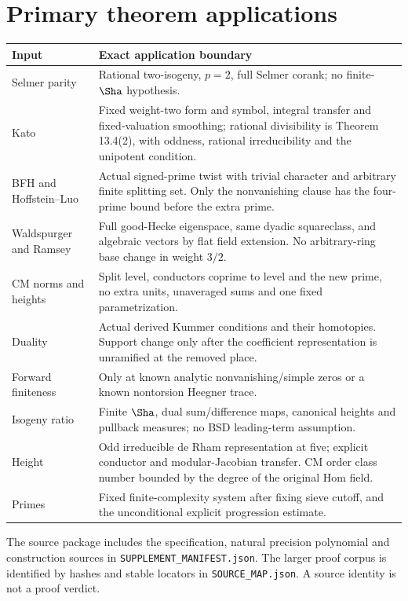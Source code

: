 \section{Primary theorem applications}
\begin{longtable}{p{}p{}}
\toprule Input & Exact application boundary\\\midrule\endhead
Selmer parity \cite{dd} & Rational two-isogeny, $p=2$, full Selmer corank;
no finite-$\Sha$ hypothesis.\\
Kato \cite{kato} & Fixed weight-two form and symbol, integral transfer and
fixed-valuation smoothing; rational divisibility is Theorem 13.4(2),
with oddness, rational irreducibility and the unipotent condition.\\
BFH and Hoffstein--Luo \cite{bfh,hl} & Actual signed-prime twist with
trivial character and arbitrary finite splitting set. Only the
nonvanishing clause has the four-prime bound before the extra prime.\\
Waldspurger and Ramsey \cite{waldspurger,ramsey} & Full good-Hecke
eigenspace, same dyadic squareclass, and algebraic vectors by flat
field extension. No arbitrary-ring base change in weight $3/2$.\\
CM norms and heights \cite{ccl,cst,cornutjetchev} & Split level,
conductors coprime to level and the new prime, no extra units,
unaveraged sums and one fixed parametrization.\\
Duality \cite{milne,nekovar} & Actual derived Kummer conditions and their
homotopies. Support change only after the coefficient representation
is unramified at the removed place.\\
Forward finiteness \cite{gz,kolyvagin} & Only at known analytic
nonvanishing/simple zeros or a known nontorsion Heegner trace.\\
Isogeny ratio \cite[proof of I.7.3]{milne} & Finite $\Sha$, dual
sum/difference maps, canonical heights and pullback measures;
no BSD leading-term assumption.\\
Height \cite{pan2022,javanpeykar,gr2014,fowler,cmheight,pazuki} &
Odd irreducible de Rham representation at five; explicit conductor
and modular-Jacobian transfer. CM order class number bounded by
the degree of the original Hom field.\\
Primes \cite{greentao,moebius,gtz,bmor} & Fixed finite-complexity system
after fixing sieve cutoff, and the unconditional explicit progression
estimate.\\\bottomrule
\end{longtable}
The source package includes the specification, natural precision polynomial
and construction sources in \nolinkurl{SUPPLEMENT_MANIFEST.json}.
The larger proof corpus is identified by hashes and stable locators in
\nolinkurl{SOURCE_MAP.json}. A source identity is not a proof verdict.

